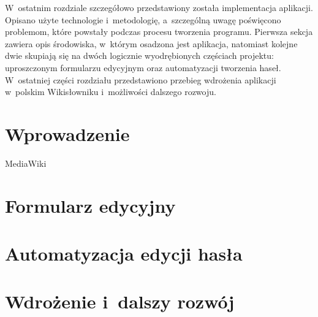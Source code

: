 \label{chap:impl}
W~ostatnim rozdziale szczegółowo przedstawiony została implementacja aplikacji. Opisano użyte technologie i~metodologię, a~szczególną uwagę poświęcono problemom, które powstały podczas procesu tworzenia programu. Pierwsza sekcja zawiera opis środowiska, w~którym osadzona jest aplikacja, natomiast kolejne dwie skupiają się na dwóch logicznie wyodrębionych częściach projektu: uproszczonym formularzu edycyjnym oraz automatyzacji tworzenia haseł. W~ostatniej części rozdziału przedstawiono przebieg wdrożenia aplikacji w~polskim Wikisłowniku i~możliwości dalszego rozwoju.

\section{Wprowadzenie}
MediaWiki


\section{Formularz edycyjny}
\label{sec:impl-form}


\section{Automatyzacja edycji hasła}
\label{sec:impl-auto}

\section{Wdrożenie i~dalszy rozwój}

